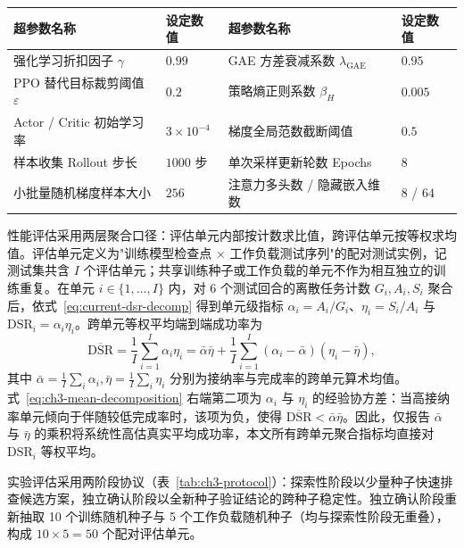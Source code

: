\begin{table}[!htbp]
    \centering
    \label{tab:ch3-ppo}
    \footnotesize
    \begin{tabular}{llll}
        \toprule
        超参数名称 & 设定数值 & 超参数名称 & 设定数值 \\
        \midrule
        强化学习折扣因子 $\gamma$ & $0.99$ & GAE 方差衰减系数 $\lambda_{\mathrm{GAE}}$ & $0.95$ \\
        PPO 替代目标裁剪阈值 $\varepsilon$ & $0.2$ & 策略熵正则系数 $\beta_H$ & $0.005$ \\
        Actor / Critic 初始学习率 & $3\times 10^{-4}$ & 梯度全局范数截断阈值 & $0.5$ \\
        样本收集 Rollout 步长 & $1000$ 步 & 单次采样更新轮数 Epochs & $8$ \\
        小批量随机梯度样本大小 & $256$ & 注意力多头数 / 隐藏嵌入维数 & $8$ / $64$ \\
        \bottomrule
    \end{tabular}
\end{table}

性能评估采用两层聚合口径：评估单元内部按计数求比值，跨评估单元按等权求均值。评估单元定义为"训练模型检查点 $\times$ 工作负载测试序列"的配对测试实例，记测试集共含 $I$ 个评估单元；共享训练种子或工作负载的单元不作为相互独立的训练重复。在单元 $i \in \{1, \dots, I\}$ 内，对 6 个测试回合的离散任务计数 $G_i, A_i, S_i$ 聚合后，依式~\eqref{eq:current-dsr-decomp} 得到单元级指标 $\alpha_i = A_i / G_i$、$\eta_i = S_i / A_i$ 与 $\mathrm{DSR}_i = \alpha_i \eta_i$。跨单元等权平均端到端成功率为
\begin{equation}
    \overline{\mathrm{DSR}} = \frac{1}{I} \sum_{i=1}^I \alpha_i \eta_i = \bar\alpha \bar\eta + \frac{1}{I}\sum_{i=1}^I (\alpha_i - \bar\alpha)(\eta_i - \bar\eta),
    \label{eq:ch3-mean-decomposition}
\end{equation}
其中 $\bar\alpha = \frac{1}{I}\sum_i \alpha_i, \bar\eta = \frac{1}{I}\sum_i \eta_i$ 分别为接纳率与完成率的跨单元算术均值。式~\eqref{eq:ch3-mean-decomposition} 右端第二项为 $\alpha_i$ 与 $\eta_i$ 的经验协方差：当高接纳率单元倾向于伴随较低完成率时，该项为负，使得 $\overline{\mathrm{DSR}} < \bar\alpha\bar\eta$。因此，仅报告 $\bar\alpha$ 与 $\bar\eta$ 的乘积将系统性高估真实平均成功率，本文所有跨单元聚合指标均直接对 $\mathrm{DSR}_i$ 等权平均。

实验评估采用两阶段协议（表~\ref{tab:ch3-protocol}）：探索性阶段以少量种子快速排查候选方案，独立确认阶段以全新种子验证结论的跨种子稳定性。独立确认阶段重新抽取 10 个训练随机种子与 5 个工作负载随机种子（均与探索性阶段无重叠），构成 $10\times5=50$ 个配对评估单元。

